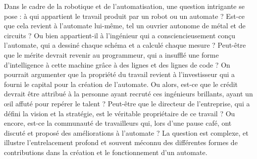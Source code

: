 Dans le cadre de la robotique et de l'automatisation, une question intrigante se pose : à qui appartient le travail produit par un robot ou un automate ? Est-ce que cela revient à l'automate lui-même, tel un ouvrier autonome de métal et de circuits ? Ou bien appartient-il à l'ingénieur qui a consciencieusement conçu l'automate, qui a dessiné chaque schéma et a calculé chaque mesure ? Peut-être que le mérite devrait revenir au programmeur, qui a insufflé une forme d'intelligence à cette machine grâce à des lignes et des lignes de code ? On pourrait argumenter que la propriété du travail revient à l'investisseur qui a fourni le capital pour la création de l'automate. Ou alors, est-ce que le crédit devrait être attribué à la personne ayant recruté ces ingénieurs brillants, ayant un œil affuté pour repérer le talent ? Peut-être que le directeur de l'entreprise, qui a défini la vision et la stratégie, est le véritable propriétaire de ce travail ? Ou encore, est-ce la communauté de travailleurs qui, lors d'une pause café, ont discuté et proposé des améliorations à l'automate ? La question est complexe, et illustre l'entrelacement profond et souvent méconnu des différentes formes de contributions dans la création et le fonctionnement d'un automate.
